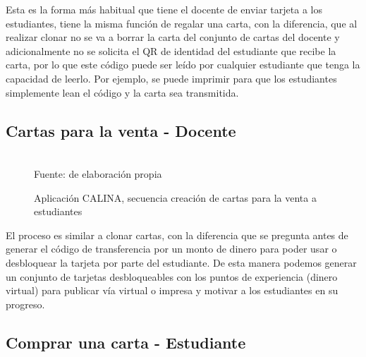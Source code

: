 Esta es la forma más habitual que tiene el docente de enviar tarjeta a los estudiantes, tiene la misma función 
de regalar una carta, con la diferencia, que al realizar clonar no se va a borrar la carta del conjunto de 
cartas del docente y adicionalmente no se solicita el QR de identidad del estudiante que recibe la carta, por 
lo que este código puede ser leído por cualquier estudiante que tenga la capacidad de leerlo. Por ejemplo, se 
puede imprimir para que los estudiantes simplemente lean el código y la carta sea transmitida.

\subsection{Cartas para la venta - Docente}

\begin{figure}[!htb]
\caption[]{Aplicación CALINA, secuencia creación de cartas para la venta a estudiantes}
\centering
\begin{adjustbox}{width=15cm}
\end{adjustbox}
\\
{\footnotesize Fuente: de elaboración propia}
\end{figure}

El proceso es similar a clonar cartas, con la diferencia que se pregunta antes de generar el código de 
transferencia por un monto de dinero para poder usar o desbloquear la tarjeta por parte del estudiante. De 
esta manera podemos generar un conjunto de tarjetas desbloqueables con los puntos de experiencia (dinero 
virtual) para publicar vía virtual o impresa y motivar a los estudiantes en su progreso.

\subsection{Comprar una carta - Estudiante}

